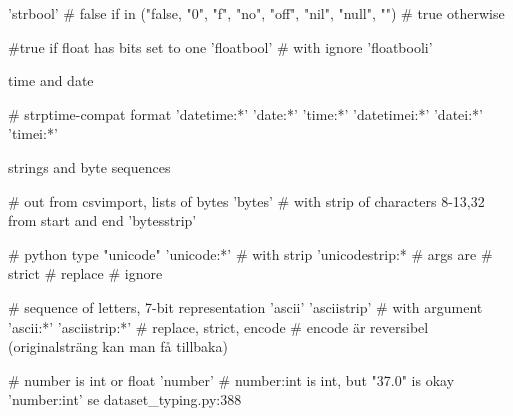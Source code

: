 \begin{python}
'strbool'
# false if in ("false, "0", "f", "no", "off", "nil", "null", "")
# true  otherwise
\end{python}

\begin{python}
#true if float has bits set to one
'floatbool'
# with ignore
'floatbooli'   
\end{python}

time and date
\\
\begin{python}
# strptime-compat format
    'datetime:*'   
    'date:*'       
    'time:*'       
    'datetimei:*'  
    'datei:*'      
    'timei:*'      
\end{python}

strings and byte sequences
\\
\begin{python}
# out from csvimport, lists of bytes
'bytes'
# with strip of characters 8-13,32 from start and end
'bytesstrip'
\end{python}

\begin{python}
# python type "unicode"
'unicode:*'    
# with strip
'unicodestrip:*
# args are
#   strict
#   replace
#   ignore
\end{python}

\begin{python}
# sequence of letters, 7-bit representation
    'ascii'        
    'asciistrip'   
# with argument
    'ascii:*'      
    'asciistrip:*' 
# replace, strict, encode
# encode är reversibel (originalsträng kan man få tillbaka)
\end{python}

\begin{python}
# number is int or float
    'number'       
# number:int is int, but "37.0" is okay
    'number:int'  se dataset_typing.py:388
\end{python}



